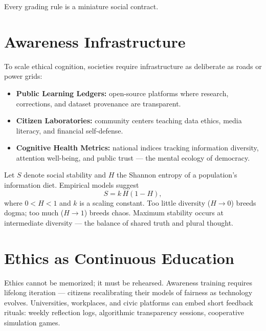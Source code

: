 \documentclass[12pt,twoside]{book}
\begin{document}
\begin{keyidea}
Every grading rule is a miniature social contract.
\end{keyidea}

\section{Awareness Infrastructure}

To scale ethical cognition, societies require infrastructure as deliberate as roads or power grids:
\begin{itemize}
  \item \textbf{Public Learning Ledgers:} open-source platforms where research, corrections, and
        dataset provenance are transparent.
  \item \textbf{Citizen Laboratories:} community centers teaching data ethics, media literacy, and
        financial self-defense.
  \item \textbf{Cognitive Health Metrics:} national indices tracking information diversity, attention
        well-being, and public trust — the mental ecology of democracy.
\end{itemize}

\begin{tcolorbox}[colback=gray!5,
  colframe=gray!60,
  boxrule=0.4pt,
  arc=1mm,
  title={Mathematical Interlude: Diversity and Stability in Knowledge Networks},
  enhanced,
  breakable,
  left=5pt,
  right=5pt]
\small
Let $S$ denote social stability and $H$ the Shannon entropy of a population’s information diet.
Empirical models suggest
\[
S = k \, H(1 - H),
\]
where $0 < H < 1$ and $k$ is a scaling constant.  
Too little diversity ($H\!\to\!0$) breeds dogma; too much ($H\!\to\!1$) breeds chaos.  
Maximum stability occurs at intermediate diversity — the balance of shared truth and plural thought.
\end{tcolorbox}

\section{Ethics as Continuous Education}

Ethics cannot be memorized; it must be rehearsed.
Awareness training requires lifelong iteration — citizens recalibrating their models of fairness as technology evolves.
Universities, workplaces, and civic platforms can embed short feedback rituals:
weekly reflection logs, algorithmic transparency sessions, cooperative simulation games.
\end{document}
